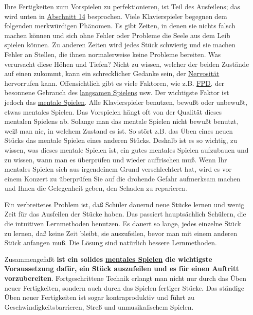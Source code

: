 Ihre Fertigkeiten zum Vorspielen zu perfektionieren, ist Teil des Ausfeilens; das wird unten in \hyperlink{c1iii14}{Abschnitt 14} besprochen.
Viele Klavierspieler begegnen dem folgenden merkwürdigen Phänomen.
Es gibt Zeiten, in denen sie nichts falsch machen können und sich ohne Fehler oder Probleme die Seele aus dem Leib spielen können.
Zu anderen Zeiten wird jedes Stück schwierig und sie machen Fehler an Stellen, die ihnen normalerweise keine Probleme bereiten.
Was verursacht diese Höhen und Tiefen?
Nicht zu wissen, welcher der beiden Zustände auf einen zukommt, kann ein schrecklicher Gedanke sein, der \hyperlink{c1iii15}{Nervosität} hervorrufen kann.
Offensichtlich gibt es viele Faktoren, wie z.B. \hyperlink{fpd}{FPD}, der besonnene Gebrauch des \hyperlink{c1ii17}{langsamen Spielens} usw.
Der wichtigste Faktor ist jedoch das \hyperlink{c1ii12}{mentale Spielen}.
Alle Klavierspieler benutzen, bewußt oder unbewußt, etwas mentales Spielen.
Das Vorspielen hängt oft von der Qualität dieses mentalen Spielens ab.
Solange man das mentale Spielen nicht bewußt benutzt, weiß man nie, in welchem Zustand es ist.
So stört z.B. das Üben eines neuen Stücks das mentale Spielen eines anderen Stücks.
Deshalb ist es so wichtig, zu wissen, was dieses mentale Spielen ist, ein gutes mentales Spielen aufzubauen und zu wissen, wann man es überprüfen und wieder auffrischen muß.
Wenn Ihr mentales Spielen sich aus irgendeinem Grund verschlechtert hat, wird es vor einem Konzert zu überprüfen Sie auf die drohende Gefahr aufmerksam machen und Ihnen die Gelegenheit geben, den Schaden zu reparieren.

Ein verbreitetes Problem ist, daß Schüler dauernd neue Stücke lernen und wenig Zeit für das Ausfeilen der Stücke haben.
Das passiert hauptsächlich Schülern, die die intuitiven Lernmethoden benutzen.
Es dauert so lange, jedes einzelne Stück zu lernen, daß keine Zeit bleibt, sie auszufeilen, bevor man mit einem anderen Stück anfangen muß.
Die Lösung sind natürlich bessere Lernmethoden.
 
Zusammengefaßt \textbf{ist ein solides \hyperlink{c1ii12}{mentales Spielen} die wichtigste Voraussetzung dafür, ein Stück auszufeilen und es für einen Auftritt vorzubereiten}.
Fortgeschrittene Technik erlangt man nicht nur durch das Üben neuer Fertigkeiten, sondern auch durch das Spielen fertiger Stücke.
Das ständige Üben neuer Fertigkeiten ist sogar kontraproduktiv und führt zu Geschwindigkeitsbarrieren, Streß und unmusikalischem Spielen.
 


